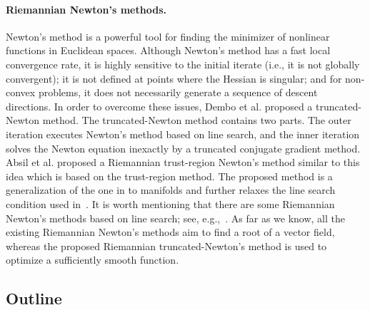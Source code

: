 \documentclass[11pt]{article}
\newcommand{\zwhcomm}[2]{{\sf\color{purple} #1}{\sf\color{blue} #2}}
\numberwithin{equation}{section}
\begin{document}
\paragraph{Riemannian Newton's methods.} Newton's method is a powerful tool for finding the minimizer of nonlinear functions in Euclidean spaces. Although Newton’s method has a fast local convergence rate, it is highly sensitive to the initial iterate (i.e., it is not globally convergent); it is not defined at points where the Hessian is singular; and for non-convex problems, it does not necessarily generate a sequence of descent directions. In order to overcome these issues, Dembo et al. \cite{dembo_truncated-newton_1983} proposed a truncated-Newton method. The truncated-Newton method contains two parts. The outer iteration executes Newton's method based on line search, and the inner iteration solves the Newton equation inexactly by a truncated conjugate gradient method. %
Absil et al. \cite{Absil2007TrustRegionMO} proposed a Riemannian trust-region Newton's method similar to this idea which is based on the trust-region method. The proposed method is a generalization of the one in \cite{dembo_truncated-newton_1983} to manifolds and further relaxes the line search condition used in~\cite{dembo_truncated-newton_1983}.  %
It is worth mentioning that there are some Riemannian Newton's methods based on line search; see, e.g.,~\cite{Bortoloti2018DampedNM,Zhao2018ARI, Wang2020RiemannianNM, Bortoloti2021AnED}. 
As far as we know, all the existing Riemannian Newton's methods aim to find a root of a vector field, whereas the proposed Riemannian truncated-Newton's method is used to optimize a sufficiently smooth function.




\subsection{Outline}
\end{document}
